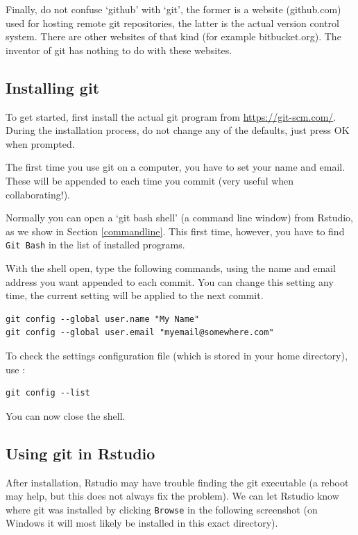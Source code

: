 \documentclass[]{book}
\begin{document}
Finally, do not confuse `github' with `git', the former is a website (github.com) used for hosting remote git repositories, the latter is the actual version control system. There are other websites of that kind (for example bitbucket.org). The inventor of git has nothing to do with these websites.

\hypertarget{installing-git}{%
\subsection{Installing git}\label{installing-git}}

To get started, first install the actual git program from \url{https://git-scm.com/}. During the installation process, do not change any of the defaults, just press OK when prompted.

The first time you use git on a computer, you have to set your name and email. These will be appended to each time you commit (very useful when collaborating!).

Normally you can open a `git bash shell' (a command line window) from Rstudio, as we show in Section \ref{commandline}. This first time, however, you have to find \texttt{Git\ Bash} in the list of installed programs.

With the shell open, type the following commands, using the name and email address you want appended to each commit. You can change this setting any time, the current setting will be applied to the next commit.

\begin{verbatim}
git config --global user.name "My Name"
git config --global user.email "myemail@somewhere.com"
\end{verbatim}

To check the settings configuration file (which is stored in your home directory), use :

\begin{verbatim}
git config --list
\end{verbatim}

You can now close the shell.

\hypertarget{using-git-in-rstudio}{%
\subsection{Using git in Rstudio}\label{using-git-in-rstudio}}

After installation, Rstudio may have trouble finding the git executable (a reboot may help, but this does not always fix the problem). We can let Rstudio know where git was installed by clicking \texttt{Browse} in the following screenshot (on Windows it will most likely be installed in this exact directory).
\end{document}
